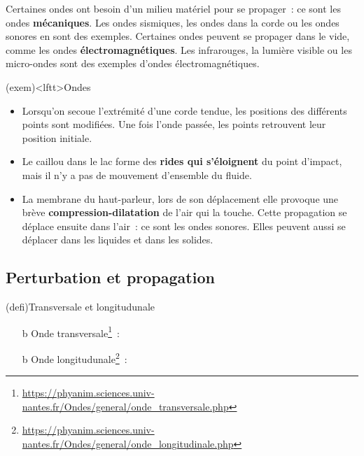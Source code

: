 \documentclass[../../main/main.tex]{subfiles}
\begin{document}
Certaines ondes ont besoin d'un milieu matériel pour se propager~: ce sont les
ondes \textbf{mécaniques}. Les ondes sismiques, les ondes dans la corde ou les
ondes sonores en sont des exemples. Certaines ondes peuvent se propager dans le
vide, comme les ondes \textbf{électromagnétiques}. Les infrarouges, la lumière
visible ou les micro-ondes sont des exemples d'ondes électromagnétiques.

\begin{tcb}[breakable](exem)<lftt>{Ondes}
	\begin{itemize}
		\item Lorsqu'on secoue l'extrémité d'une corde tendue,
		      les positions des différents points sont modifiées. Une fois l'onde
		      passée, les points retrouvent leur position initiale.
		\item Le caillou dans le lac forme des \textbf{rides qui s'éloignent} du point
		      d'impact, mais il n'y a pas de mouvement d'ensemble du
		      fluide.
		\item La membrane du haut-parleur, lors de son déplacement elle provoque
		      une brève \textbf{compression-dilatation} de l'air qui la touche.
		      Cette propagation se déplace ensuite dans l'air~: ce sont les ondes
		      sonores. Elles peuvent aussi se déplacer dans les liquides et dans
		      les solides.
	\end{itemize}
\end{tcb}

\subsection{Perturbation et propagation}


\begin{tcb*}(defi){Transversale et longitudunale}
	\begin{itemize}
		\item[b]{Onde transversale}\footnote{\url{https://phyanim.sciences.univ-nantes.fr/Ondes/general/onde_transversale.php}}~:
		\item[b]{Onde longitudunale}\footnote{\url{https://phyanim.sciences.univ-nantes.fr/Ondes/general/onde_longitudinale.php}}~:
	\end{itemize}
\end{tcb*}
\end{document}
